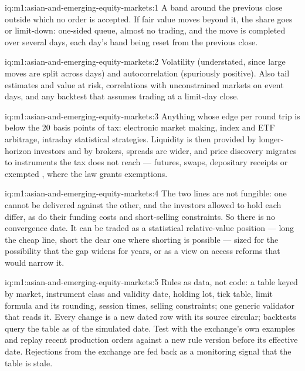 \begin{solution}{iq:m1:asian-and-emerging-equity-markets:1}
A band around the previous close outside which no order is accepted. If fair
value moves beyond it, the share goes  or limit-down: one-sided queue,
almost no trading, and the move is completed over several days, each day's
band being reset from the previous close.
\end{solution}

\begin{solution}{iq:m1:asian-and-emerging-equity-markets:2}
Volatility (understated, since large moves are split across days) and
autocorrelation (spuriously positive). Also tail estimates and value at risk,
correlations with unconstrained markets on event days, and any backtest that
assumes trading at a limit-day close.
\end{solution}

\begin{solution}{iq:m1:asian-and-emerging-equity-markets:3}
Anything whose edge per round trip is below the 20 basis points of tax:
electronic market making, index and ETF arbitrage, intraday statistical
strategies. Liquidity is then provided by longer-horizon investors and by
brokers, spreads are wider, and price discovery migrates to instruments the
tax does not reach --- futures, swaps, depositary receipts or exempted , where the law grants exemptions.
\end{solution}

\begin{solution}{iq:m1:asian-and-emerging-equity-markets:4}
The two lines are not fungible: one cannot be delivered against the other,
and the investors allowed to hold each differ, as do their funding costs and
short-selling constraints. So there is no convergence date. It can be traded
as a statistical relative-value position --- long the cheap line, short the
dear one where shorting is possible --- sized for the possibility that the
gap widens for years, or as a view on access reforms that would narrow it.
\end{solution}

\begin{solution}{iq:m1:asian-and-emerging-equity-markets:5}
Rules as data, not code: a table keyed by market, instrument class and
validity date, holding lot, tick table, limit formula and its rounding,
session times, selling constraints; one generic validator that reads it.
Every change is a new dated row with its source circular; backtests query the
table as of the simulated date. Test with the exchange's own examples and
replay recent production orders against a new rule version before its
effective date. Rejections from the exchange are fed back as a monitoring
signal that the table is stale.
\end{solution}

